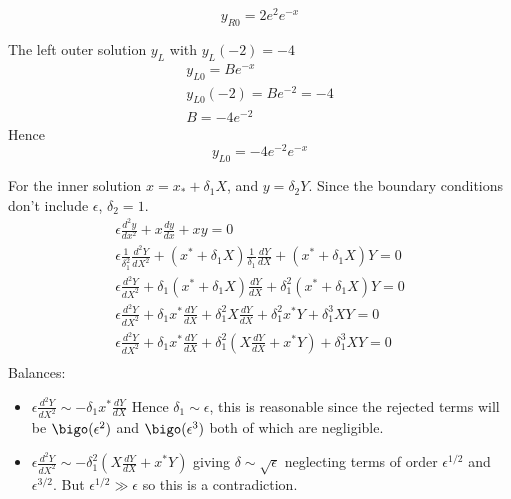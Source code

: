 \documentclass{X:/Documents/Coding/Latex/myassignment}
\begin{document}
\begin{enumerate}
	\[\boxed{y_{R0} = 2e^2e^{-x} } \]
	
	The left outer solution $y_L$ with $y_L(-2) =-4$
	\begin{align*}
	y_{L0} = Be^{-x}\\
	y_{L0}(-2) = Be^{-2} = -4\\
	B = -4e^{-2}
	\end{align*}
	Hence
	\[\boxed{y_{L0} = -4e^{-2}e^{-x} } \]

	For the inner solution $x = x_* + \delta_1 X$, and $y = \delta_2 Y$. Since the boundary conditions don't include $\epsilon$, $\delta_2 =1$.
	\begin{align*}
		\epsilon \frac{d^2y}{dx^2} + x\frac{dy}{dx} + xy =0\\
		\epsilon \frac{1}{\delta_1^2}\frac{d^2Y}{dX^2} + (x^* + \delta_1X)\frac{1}{\delta_1}\frac{dY}{dX} + (x^* +\delta_1 X)Y =0\\
		\epsilon \frac{d^2Y}{dX^2} + \delta_1 (x^* + \delta_1 X)\frac{dY}{dX} + \delta_1^2 (x^* + \delta_1X)Y = 0\\
		\epsilon \frac{d^2Y}{dX^2} + \delta_1 x^*\frac{dY}{dX} + \delta_1^2 X\frac{dY}{dX} + \delta_1^2 x^*Y+ \delta_1^{3}XY = 0\\
		\epsilon \frac{d^2Y}{dX^2} + \delta_1 x^*\frac{dY}{dX} + \delta_1^2\left( X\frac{dY}{dX} + x^*Y\right)+ \delta_1^{3}XY = 0\\
	\end{align*}
	Balances:
	\begin{itemize}
		\item $\epsilon \frac{d^2Y}{dX^2} \sim -\delta_1 x^*\frac{dY}{dX}$ Hence $\delta_1 \sim \epsilon$, this is reasonable since the rejected terms will be $\bigo(\epsilon^2)$ and $\bigo(\epsilon^3)$ both of which are negligible.
		\item $\epsilon \frac{d^2Y}{dX^2} \sim - \delta_1^2\left( X\frac{dY}{dX} + x^*Y\right) $ giving $\delta \sim \sqrt{\epsilon}$ neglecting terms of order $\epsilon^{1/2}$ and $\epsilon^{3/2}$. But $\epsilon^{1/2}\gg \epsilon$ so this is a contradiction. 

\end{itemize}
\end{enumerate}
\end{document}
